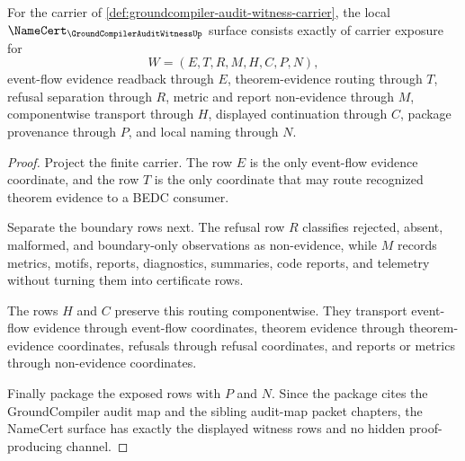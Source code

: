 \begin{theorem}
\label{thm:groundcompiler-audit-witness-namecert-obligations}
For the carrier of \autoref{def:groundcompiler-audit-witness-carrier}, the local $\NameCert_{\GroundCompilerAuditWitnessUp}$ surface consists exactly of carrier exposure for
$$
W=(E,T,R,M,H,C,P,N),
$$
event-flow evidence readback through $E$, theorem-evidence routing through $T$, refusal separation through $R$, metric and report non-evidence through $M$, componentwise transport through $H$, displayed continuation through $C$, package provenance through $P$, and local naming through $N$.
\end{theorem}
\begin{proof}
Project the finite carrier. The row $E$ is the only event-flow evidence coordinate, and the row $T$ is the only coordinate that may route recognized theorem evidence to a BEDC consumer.

Separate the boundary rows next. The refusal row $R$ classifies rejected, absent, malformed, and boundary-only observations as non-evidence, while $M$ records metrics, motifs, reports, diagnostics, summaries, code reports, and telemetry without turning them into certificate rows.

The rows $H$ and $C$ preserve this routing componentwise. They transport event-flow evidence through event-flow coordinates, theorem evidence through theorem-evidence coordinates, refusals through refusal coordinates, and reports or metrics through non-evidence coordinates.

Finally package the exposed rows with $P$ and $N$. Since the package cites the GroundCompiler audit map and the sibling audit-map packet chapters, the NameCert surface has exactly the displayed witness rows and no hidden proof-producing channel.
\end{proof}

